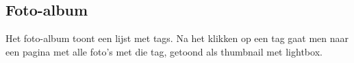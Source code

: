 \subsection{Foto-album}\label{fotoalbum}

Het foto-album toont een lijst met tags. Na het klikken op een tag gaat men naar een pagina met alle foto's met die tag, getoond als thumbnail met lightbox.
